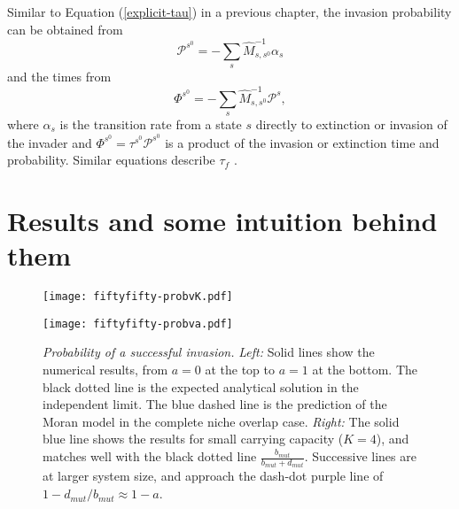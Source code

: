 Similar to Equation (\ref{explicit-tau}) in a previous chapter, the invasion probability can be obtained from \cite{Nisbet1982,Iyer-Biswas2015}
\begin{equation}
\mathcal{P}^{s^0} = -\sum_s \hat{M}^{-1}_{s,s^0}\alpha_{s} %
\end{equation}
and the times from
\begin{equation}
\Phi^{s^0} = -\sum_s \hat{M}^{-1}_{s,s^0}\mathcal{P}^{s}, %
\end{equation}
where $\alpha_s$ is the transition rate from a state $s$ directly to extinction or invasion of the invader and $\Phi^{s^0}=\tau^{s^0}\mathcal{P}^{s^0}$ is a product of the invasion or extinction time and probability. 
Similar equations describe $\tau_f$ \cite{Nisbet1982,Iyer-Biswas2015}.


\section{Results and some intuition behind them}
\begin{figure}[h]
	\centering
	\begin{minipage}{0.49\linewidth}
		\centering
		\texttt{[image: fiftyfifty-probvK.pdf]}
	\end{minipage}
	\begin{minipage}{0.49\linewidth}
		\centering
		\texttt{[image: fiftyfifty-probva.pdf]}
	\end{minipage}
	\caption{\emph{Probability of a successful invasion.}
		\emph{Left:} Solid lines show the numerical results, from $a=0$ at the top to $a=1$ at the bottom. The black dotted line is the expected analytical solution in the independent limit. The blue dashed line is the prediction of the Moran model in the complete niche overlap case.
		\emph{Right:} The solid blue line shows the results for small carrying capacity ($K=4$), and matches well with the black dotted line $\frac{b_{mut}}{b_{mut}+d_{mut}}$. Successive lines are at larger system size, and approach the dash-dot purple line of $1-d_{mut}/b_{mut}\approx 1-a$.
	} \label{Esucc}
\end{figure}

